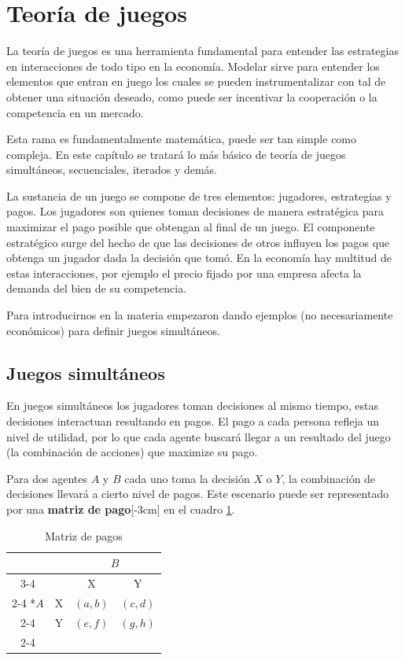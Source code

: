 \section{Teoría de juegos}

La teoría de juegos es una herramienta fundamental para entender las estrategias en interacciones de todo tipo en la economía. Modelar sirve para entender los elementos que entran en juego los cuales se pueden instrumentalizar con tal de obtener una situación deseado, como puede ser incentivar la cooperación o la competencia en un mercado. 

Esta rama es fundamentalmente matemática, puede ser tan simple como compleja. En este capítulo se tratará lo más básico de teoría de juegos simultáneos, secuenciales, iterados y demás. 

La sustancia de un juego se compone de tres elementos: jugadores, estrategias y pagos. Los jugadores son quienes toman decisiones de manera estratégica para maximizar el pago posible que obtengan al final de un juego. El componente estratégico surge del hecho de que las decisiones de otros influyen los pagos que obtenga un jugador dada la decisión que tomó. En la economía hay multitud de estas interacciones, por ejemplo el precio fijado por una empresa afecta la demanda del bien de su competencia. 

Para introducirnos en la materia empezaron dando ejemplos (no necesariamente económicos) para definir juegos simultáneos.

\subsection{Juegos simultáneos}

En juegos simultáneos los jugadores toman decisiones al mismo tiempo, estas decisiones interactuan resultando en pagos. El pago a cada persona refleja un nivel de utilidad, por lo que cada agente buscará llegar a un resultado del juego (la combinación de acciones) que maximize su pago. 

Para dos agentes $A$ y $B$ cada uno toma la decisión $X$ o $Y$, la combinación de decisiones llevará a cierto nivel de pagos. Este escenario puede ser representado por una \textbf{matriz de pago}[-3cm] en el cuadro \ref{cuadro: matriz de pago genérica}.

\begin{table}[!htbp]
  
  \centering
  \caption{Matriz de pagos}
  \setlength{\extrarowheight}{2pt}
  \label{cuadro: matriz de pago genérica}
  \begin{tabular}{*{4}{c|}}
    \multicolumn{2}{c}{} & \multicolumn{2}{c}{$B$}\\\cline{3-4}
    \multicolumn{1}{c}{} &  & X  & Y \\\cline{2-4}
    \multirow{2}*{$A$}  & X & $(a,b)$ & $(c,d)$ \\\cline{2-4}
    & Y & $(e,f)$ & $(g,h)$ \\\cline{2-4} 
  \end{tabular}
\end{table}

